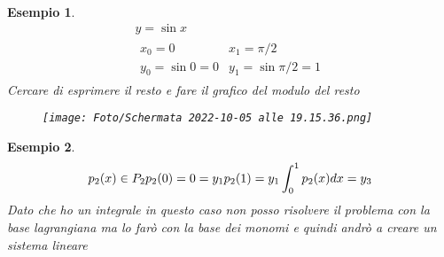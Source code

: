 \documentclass[a4paper, portrait]{book}
\numberwithin{equation}{chapter} %
\newtheorem{example}{Esempio}
\begin{document}
\begin{example}
    \begin{gather}
        y = \sin x\\
        \begin{matrix}
            x_0 = 0&x_1=\pi/2\\
            y_0 = \sin 0 = 0&y_1 = \sin \pi/2 = 1
        \end{matrix}
    \end{gather}
    Cercare di esprimere il resto e fare il grafico del modulo del resto
    \begin{figure}[h!]
        \centering
        \texttt{[image: Foto/Schermata 2022-10-05 alle 19.15.36.png]}
        \caption{}
    \end{figure}
\end{example}
\begin{example}
    \begin{equation}
        p_2(x) \in P_2\\
        p_2(0) = 0 = y_1\\
        p_2(1) = y_1\\
        \int_0^1 p_2(x) dx=y_3 
    \end{equation}
    Dato che ho un integrale in questo caso non posso risolvere il problema con la base lagrangiana ma lo farò con la base dei monomi e quindi andrò a creare un sistema lineare
\end{example}
\end{document}
